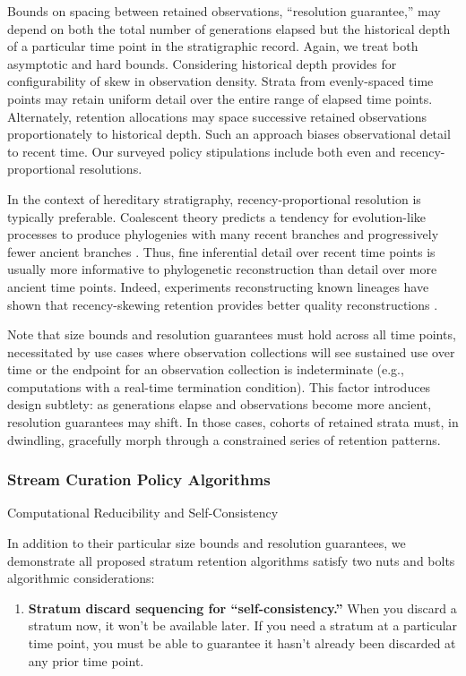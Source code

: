 Bounds on spacing between retained observations, ``resolution guarantee,'' may depend on both the total number of generations elapsed but the historical depth of a particular time point in the stratigraphic record.
Again, we treat both asymptotic and hard bounds.
Considering historical depth provides for configurability of skew in observation density.
Strata from evenly-spaced time points may retain uniform detail over the entire range of elapsed time points.
Alternately, retention allocations may space successive retained observations proportionately to historical depth.
Such an approach biases observational detail to recent time.
Our surveyed policy stipulations include both even and recency-proportional resolutions.

In the context of hereditary stratigraphy, recency-proportional resolution is typically preferable.
Coalescent theory predicts a tendency for evolution-like processes to produce phylogenies with many recent branches and progressively fewer ancient branches \citep{nordborgCoalescentTheory2019, berestyckiRecentProgressCoalescent2009}.
Thus, fine inferential detail over recent time points is usually more informative to phylogenetic reconstruction than detail over more ancient time points.
Indeed, experiments reconstructing known lineages have shown that recency-skewing retention provides better quality reconstructions \citep{moreno2022hereditary}.

Note that size bounds and resolution guarantees must hold across all time points, necessitated by use cases where observation collections will see sustained use over time or the endpoint for an observation collection is indeterminate (e.g., computations with a real-time termination condition).
This factor introduces design subtlety: as generations elapse and observations become more ancient, resolution guarantees may shift.
In those cases, cohorts of retained strata must, in dwindling, gracefully morph through a constrained series of retention patterns.

\subsubsection{Stream Curation Policy Algorithms}

Computational Reducibility and Self-Consistency

In addition to their particular size bounds and resolution guarantees, we demonstrate all proposed stratum retention algorithms satisfy two nuts and bolts algorithmic considerations:
\begin{enumerate}

\item \textbf{Stratum discard sequencing for ``self-consistency.''}
  When you discard a stratum now, it won't be available later.
  If you need a stratum at a particular time point, you must be able to guarantee it hasn't already been discarded at any prior time point.

\end{enumerate}

